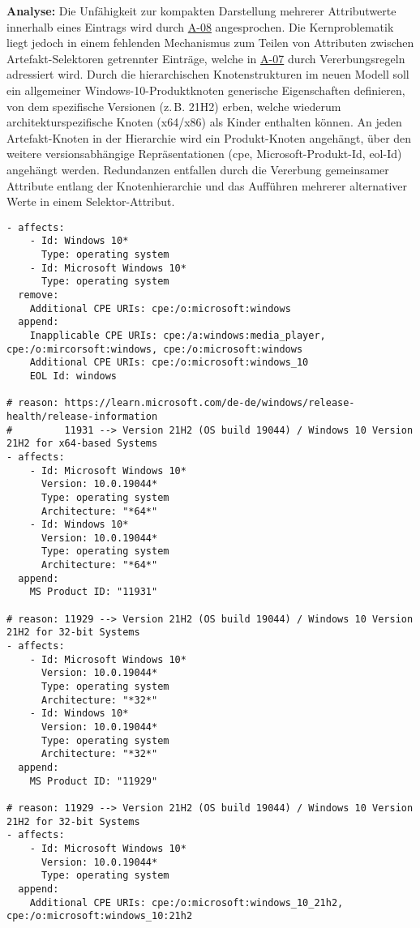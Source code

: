 \textbf{Analyse:}
Die Unfähigkeit zur kompakten Darstellung mehrerer Attributwerte innerhalb eines Eintrags wird durch \hyperref[subsec:req-multiple-attribute-values]{A-08} angesprochen.
Die Kernproblematik liegt jedoch in einem fehlenden Mechanismus zum Teilen von Attributen zwischen Artefakt-Selektoren getrennter Einträge, welche in \hyperref[subsec:req-selektor-inheritance]{A-07} durch Vererbungsregeln adressiert wird.
Durch die hierarchischen Knotenstrukturen im neuen Modell soll ein allgemeiner Windows-10-Produktknoten generische Eigenschaften definieren, von dem spezifische Versionen (z.\,B. 21H2) erben, welche wiederum architekturspezifische Knoten (x64/x86) als Kinder enthalten können.
An jeden Artefakt-Knoten in der Hierarchie wird ein Produkt-Knoten angehängt, über den weitere versionsabhängige Repräsentationen (\acrshort{cpe}, Microsoft-Produkt-Id, \acrshort{eol}-Id) angehängt werden.
Redundanzen entfallen durch die Vererbung gemeinsamer Attribute entlang der Knotenhierarchie und das Aufführen mehrerer alternativer Werte in einem Selektor-Attribut.

\begin{lstlisting}[style=yaml,caption={Windows-Korrelation mit mehreren Identifikatoren},label={lst:reference-case-windows},basicstyle=\ttfamily\scriptsize]
- affects:
    - Id: Windows 10*
      Type: operating system
    - Id: Microsoft Windows 10*
      Type: operating system
  remove:
    Additional CPE URIs: cpe:/o:microsoft:windows
  append:
    Inapplicable CPE URIs: cpe:/a:windows:media_player, cpe:/o:mircorsoft:windows, cpe:/o:microsoft:windows
    Additional CPE URIs: cpe:/o:microsoft:windows_10
    EOL Id: windows

# reason: https://learn.microsoft.com/de-de/windows/release-health/release-information
#         11931 --> Version 21H2 (OS build 19044) / Windows 10 Version 21H2 for x64-based Systems
- affects:
    - Id: Microsoft Windows 10*
      Version: 10.0.19044*
      Type: operating system
      Architecture: "*64*"
    - Id: Windows 10*
      Version: 10.0.19044*
      Type: operating system
      Architecture: "*64*"
  append:
    MS Product ID: "11931"

# reason: 11929 --> Version 21H2 (OS build 19044) / Windows 10 Version 21H2 for 32-bit Systems
- affects:
    - Id: Microsoft Windows 10*
      Version: 10.0.19044*
      Type: operating system
      Architecture: "*32*"
    - Id: Windows 10*
      Version: 10.0.19044*
      Type: operating system
      Architecture: "*32*"
  append:
    MS Product ID: "11929"

# reason: 11929 --> Version 21H2 (OS build 19044) / Windows 10 Version 21H2 for 32-bit Systems
- affects:
    - Id: Microsoft Windows 10*
      Version: 10.0.19044*
      Type: operating system
  append:
    Additional CPE URIs: cpe:/o:microsoft:windows_10_21h2, cpe:/o:microsoft:windows_10:21h2
\end{lstlisting}
